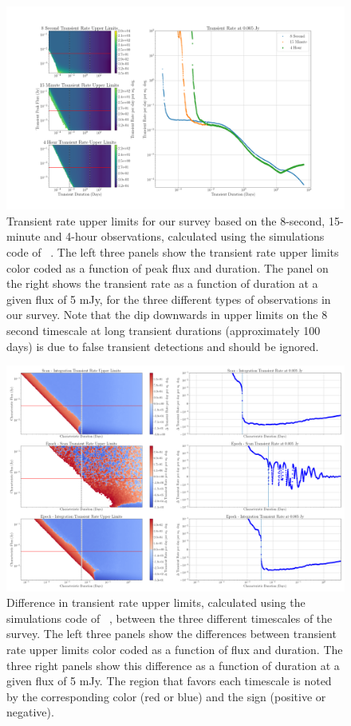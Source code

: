\documentclass[12pt]{article}
\begin{document}
\begin{landscape}
\begin{figure}
	\includegraphics[width=1.5\textwidth]{allplots.png}
	\caption{Transient rate upper limits for our survey based on the 8-second, 15-minute and 4-hour observations, calculated using the simulations code of ~\citet{2022ascl.soft04007C}. The left three panels show the transient rate upper limits color coded as a function of peak flux and duration. The panel on the right shows the transient rate as a function of duration at a given flux of 5 mJy, for the three different types of observations in our survey. Note that the dip downwards in upper limits on the 8 second timescale at long transient durations (approximately 100 days) is due to false transient detections and should be ignored.}
	\label{fig:threelimits}
\end{figure}

\begin{figure}
	\includegraphics[width=1.5\textwidth]{diffplots.png}
	\caption{Difference in transient rate upper limits, calculated using the simulations code of ~\citet{2022ascl.soft04007C}, between the three different timescales of the survey. The left three panels show the differences between transient rate upper limits color coded as a function of flux and duration. The three right panels show this difference as a function of duration at a given flux of 5 mJy. The region that favors each timescale is noted by the corresponding color (red or blue) and the sign (positive or negative).}
	\label{fig:threediff}
\end{figure}

\end{landscape}
\restoregeometry
 \doublespacing
\end{document}
